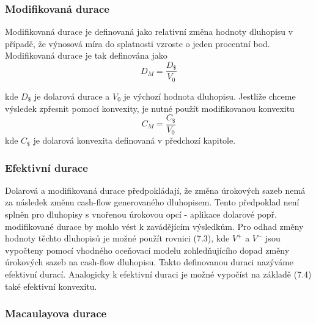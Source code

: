 \documentclass[a4paper]{book}
\begin{document}
\subsubsection{Modifikovaná durace}

Modifikovaná durace je definovaná jako relativní změna hodnoty dluhopisu v případě, že výnosová míra do splatnosti vzroste o jeden procentní bod. Modifikovaná durace je tak definována jako
\begin{equation*}
D_M = \frac{D_{\$}}{V_0}
\end{equation*}

kde $D_{\$}$ je dolarová durace a $V_0$ je výchozí hodnota dluhopisu. Jestliže chceme výsledek zpřesnit pomocí konvexity, je nutné použít modifikovanou konvexitu
\begin{equation*}
C_M = \frac{C_{\$}}{V_0}
\end{equation*}
kde $C_{\$}$ je dolarová konvexita definovaná v předchozí kapitole.

\subsubsection{Efektivní durace}

Dolarová a modifikovaná durace předpokládají, že změna úrokových sazeb nemá za následek změnu cash-flow generovaného dluhopisem. Tento předpoklad není splněn pro dluhopisy s vnořenou úrokovou opcí - aplikace dolarové popř. modifikované durace by mohlo vést k zavádějícím výsledkům. Pro odhad změny hodnoty těchto dluhopisů je možné použít rovnici (7.3), kde $V^{+}$ a $V^{-}$ jsou vypočteny pomocí vhodného oceňovací modelu zohledňujícího dopad změny úrokových sazeb na cash-flow dluhopisu. Takto definovanou duraci nazýváme efektivní durací. Analogicky k efektivní duraci je možné vypočíst na základě (7.4) také efektivní konvexitu.

\subsubsection{Macaulayova durace}
\end{document}
